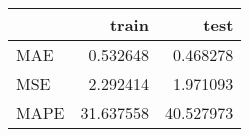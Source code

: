 \begin{tabular}{lrr}
\toprule
{} &      train &       test \\
\midrule
MAE  &   0.532648 &   0.468278 \\
MSE  &   2.292414 &   1.971093 \\
MAPE &  31.637558 &  40.527973 \\
\bottomrule
\end{tabular}
